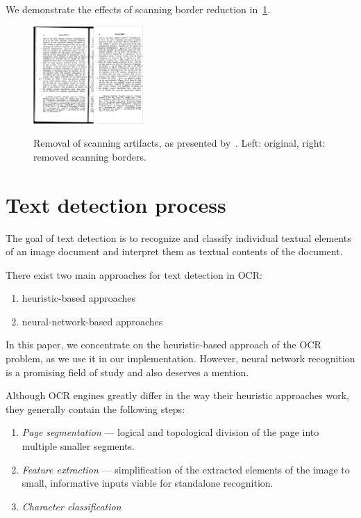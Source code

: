 We demonstrate the effects of scanning border reduction in~\cref{fig:marginalNoise}.

\begin{figure}
\centering
\includegraphics[height=10em]{img/preprocessing/scan_borders_orig.png}
\qquad
\includegraphics[height=10em]{img/preprocessing/scan_borders_result.png}
\caption{Removal of scanning artifacts, as presented by~\citet{TesseractQual}. Left: original, right: removed scanning borders.}
\label{fig:marginalNoise}
\end{figure}

\section{Text detection process}

The goal of text detection is to recognize and classify individual textual elements of an image document and interpret them as textual contents of the document.

There exist two main approaches for text detection in OCR:
\begin{enumerate}
    \item heuristic-based approaches
    \item neural-network-based approaches
\end{enumerate}

In this paper, we concentrate on the heuristic-based approach of the OCR problem, as we use it in our implementation. However, neural network recognition is a promising field of study and also deserves a mention.

Although OCR engines greatly differ in the way their heuristic approaches work, they generally contain the following steps:
\begin{enumerate}
    \item \emph{Page segmentation} --- logical and topological division of the page into multiple smaller segments.
    \item \emph{Feature extraction} --- simplification of the extracted elements of the image to small, informative inputs viable for standalone recognition.
    \item \emph{Character classification}
\end{enumerate}

